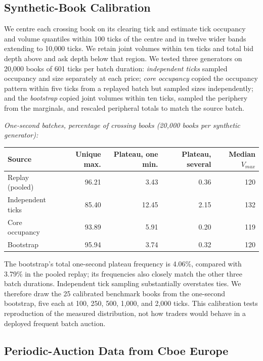 \subsection{Synthetic-Book Calibration}
\label{app:zq-data-calibration}

We centre each crossing book on its clearing tick and estimate tick occupancy and volume quantiles within 100 ticks of the centre and in twelve wider bands extending to 10,000 ticks. We retain joint volumes within ten ticks and total bid depth above and ask depth below that region. We tested three generators on 20,000 books of 601 ticks per batch duration: \emph{independent ticks} sampled occupancy and size separately at each price; \emph{core occupancy} copied the occupancy pattern within five ticks from a replayed batch but sampled sizes independently; and the \emph{bootstrap} copied joint volumes within ten ticks, sampled the periphery from the marginals, and rescaled peripheral totals to match the source batch.

\noindent\textit{One-second batches, percentage of crossing books (20,000 books per synthetic generator):}
\begin{center}
\small
\setlength{\tabcolsep}{4pt}
\begin{tabular}{@{}lrrrr@{}}
\toprule
Source & Unique max. & Plateau, one min. & Plateau, several & Median $V_{max}$ \\
\midrule
Replay (pooled) & 96.21 & 3.43 & 0.36 & 120 \\
Independent ticks & 85.40 & 12.45 & 2.15 & 132 \\
Core occupancy & 93.89 & 5.91 & 0.20 & 119 \\
Bootstrap & 95.94 & 3.74 & 0.32 & 120 \\
\bottomrule
\end{tabular}
\end{center}

The bootstrap's total one-second plateau frequency is 4.06\%, compared with 3.79\% in the pooled replay; its frequencies also closely match the other three batch durations. Independent tick sampling substantially overstates ties. We therefore draw the 25 calibrated benchmark books from the one-second bootstrap, five each at 100, 250, 500, 1,000, and 2,000 ticks. This calibration tests reproduction of the measured distribution, not how traders would behave in a deployed frequent batch auction.

\subsection{Periodic-Auction Data from Cboe Europe}
\label{app:zq-cboe}

